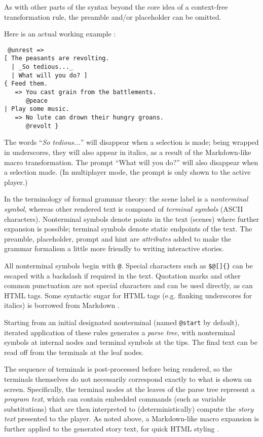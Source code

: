 \documentclass{acm_proc_article-sp}
\begin{document}
As with other parts of the syntax beyond the core idea of a context-free transformation rule,
the preamble and/or placeholder can be omitted.

Here is an actual working example \cite{ChoiceOfGamesBlog}:
\begin{verbatim}
 @unrest =>
[ The peasants are revolting. 
  | _So tedious..._ 
  | What will you do? ] 
{ Feed them.
   => You cast grain from the battlements.
      @peace
| Play some music.
   => No lute can drown their hungry groans.
      @revolt }
\end{verbatim}

The words ``{\em So tedious...}'' will disappear when a selection is made; being wrapped in underscores, they will also appear in italics, as a result of the Markdown-like macro transformation.
The prompt ``What will you do?'' will also disappear when a selection made.
(In multiplayer mode, the prompt is only shown to the active player.)



In the terminology of formal grammar theory: the scene label {\tt \@scene} is a {\em nonterminal symbol},
whereas other rendered text is composed of {\em terminal symbols} (ASCII characters).
Nonterminal symbols denote points in the text (scenes) where further expansion is possible;
terminal symbols denote static endpoints of the text.
The preamble, placeholder, prompt and hint are {\em attributes}
added to make the grammar formalism a little more friendly to writing interactive stories.

All nonterminal symbols begin with {\tt @}.
Special characters such as {\tt \$@[]\{\}} can be escaped with a backslash if required in the text.
Quotation marks and other common punctuation are not special characters and can be used directly, as can HTML tags.
Some syntactic sugar for HTML tags (e.g. flanking underscores for italics) is borrowed from Markdown \cite{Markdown}.

Starting from an initial designated nonterminal (named {\tt @start} by default),
iterated application of these rules generates a {\em parse tree},
with nonterminal symbols at internal nodes and terminal symbols at the tips.
The final text can be read off from the terminals at the leaf nodes.

The sequence of terminals is post-processed before being rendered,
so the terminals themselves do not necessarily correspond exactly to what is shown on screen.
Specifically, the terminal nodes at the leaves of the parse tree represent a {\em program text},
which can contain embedded commands (such as variable substitutions)
that are then interpreted to (deterministically) compute the {\em story text} presented to the player.
As noted above, a Markdown-like macro expansion is further applied to the generated story text,
for quick HTML styling \cite{Markdown}.
\end{document}
